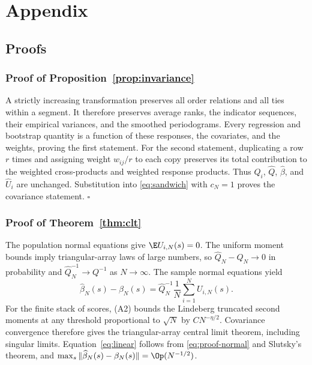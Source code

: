 \appendix
\section*{Appendix}
\renewcommand{\theequation}{A.\arabic{equation}}
\setcounter{equation}{0}
\renewcommand{\thetable}{A\arabic{table}}
\setcounter{table}{0}
\renewcommand{\thefigure}{A\arabic{figure}}
\setcounter{figure}{0}
\renewcommand{\thesubsection}{A.\arabic{subsection}}
\setcounter{subsection}{0}
\subsection{Proofs}
\subsubsection*{Proof of Proposition~\ref{prop:invariance}}
A strictly increasing transformation preserves all order relations and all ties within a segment. It therefore preserves average ranks, the indicator sequences, their empirical variances, and the smoothed periodograms. Every regression and bootstrap quantity is a function of these responses, the covariates, and the weights, proving the first statement. For the second statement, duplicating a row $r$ times and assigning weight $w_{ij}/r$ to each copy preserves its total contribution to the weighted cross-products and weighted response products. Thus $Q_i$, $\widehat Q$, $\widehat\beta$, and $\widehat U_i$ are unchanged. Substitution into \eqref{eq:sandwich} with $c_N=1$ proves the covariance statement. \hfill$\square$

\subsubsection*{Proof of Theorem~\ref{thm:clt}}
The population normal equations give $\E U_{i,N}(s)=0$. The uniform moment bounds imply triangular-array laws of large numbers, so $\widehat Q_N-Q_N\to0$ in probability and $\widehat Q_N^{-1}\to Q^{-1}$ as $N\to\infty$. The sample normal equations yield
\begin{equation}\label{eq:proof-normal}
 \widehat\beta_N(s)-\beta_N(s)
 =\widehat Q_N^{-1}\frac1N\sum_{i=1}^N U_{i,N}(s).
\end{equation}
For the finite stack of scores, (A2) bounds the Lindeberg truncated second moments at any threshold proportional to $\sqrt N$ by $CN^{-\eta/2}$. Covariance convergence therefore gives the triangular-array central limit theorem, including singular limits. Equation~\eqref{eq:linear} follows from \eqref{eq:proof-normal} and Slutsky's theorem, and $\max_s\|\widehat\beta_N(s)-\beta_N(s)\|=\Op(N^{-1/2})$.

